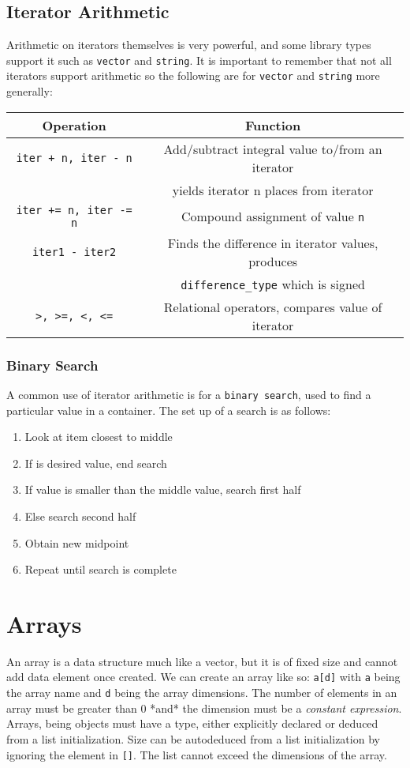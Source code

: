 \documentclass[12pt, a4paper]{report}
\begin{document}
\subsection{Iterator Arithmetic}
Arithmetic on iterators themselves is very powerful, and some library types support it such as \verb|vector| and \verb|string|.
It is important to remember that not all iterators support arithmetic so the following are for \verb|vector| and \verb|string| more generally:
\newline
\begin{center}
	\begin{tabular}{ |c|c| }
		\hline
		Operation & Function \\
		\hline
		\verb|iter + n, iter - n| & Add/subtract integral value to/from an iterator \\
					  & yields iterator n places from iterator \\
		\hline
		\verb|iter += n, iter -= n| & Compound assignment of value \verb|n| \\
		\hline
		\verb|iter1 - iter2| & Finds the difference in iterator values, produces \\
				     & \verb|difference_type| which is signed \\
		\hline
		\verb|>, >=, <, <=| & Relational operators, compares value of iterator \\
		\hline
	\end{tabular}
\end{center}
\subsubsection{Binary Search}
A common use of iterator arithmetic is for a \verb|binary search|, used to find a particular value in a container.
The set up of a search is as follows:
\begin{center}
	\begin{enumerate}
		\item Look at item closest to middle 
		\item If is desired value, end search
		\item If value is smaller than the middle value, search first half
		\item Else search second half
		\item Obtain new midpoint
		\item Repeat until search is complete
	\end{enumerate}
\end{center}
\section{Arrays}
An array is a data structure much like a vector, but it is of fixed size and cannot add data element once created.
We can create an array like so: \verb|a[d]| with \verb|a| being the array name and \verb|d| being the array dimensions.
The number of elements in an array must be greater than 0 *and* the dimension must be a \emph{constant expression}.
Arrays, being objects must have a type, either explicitly declared or deduced from a list initialization.
Size can be autodeduced from a list initialization by ignoring the element in \verb|[]|.
The list cannot exceed the dimensions of the array. 
\end{document}
